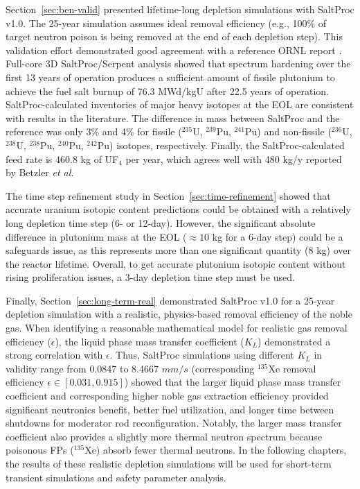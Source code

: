Section~\ref{sec:ben-valid} presented lifetime-long depletion simulations with 
SaltProc v1.0. The 25-year simulation assumes ideal removal efficiency 
(e.g., 100\% of target neutron poison is being removed at the end of each 
depletion 
step). This validation effort demonstrated good agreement with a reference 
ORNL report \cite{betzler_assessment_2017-1}. Full-core 3D SaltProc/Serpent 
analysis showed that spectrum 
hardening over the first 13 years of operation 
produces a sufficient amount of fissile plutonium to achieve the fuel salt 
burnup of 76.3 MWd/kgU after 22.5 years of operation. SaltProc-calculated 
inventories of major heavy isotopes at the \gls{EOL} are consistent with 
results in the literature. The difference in mass between SaltProc and the 
reference was only 3\% and 4\% for fissile ($^{235}$U, $^{239}$Pu, $^{241}$Pu) 
and non-fissile ($^{236}$U, $^{238}$U, $^{238}$Pu, $^{240}$Pu, $^{242}$Pu) 
isotopes, respectively. Finally, the SaltProc-calculated feed rate is 460.8 kg 
of UF$_4$ per year, which agrees well with 480 kg/y reported by Betzler 
\emph{et al.} \cite{betzler_assessment_2017-1}

The time step refinement study in Section~\ref{sec:time-refinement} showed 
that accurate uranium isotopic content predictions could be obtained with a 
relatively long depletion time step (6- or 12-day). However, the significant 
absolute difference in plutonium mass at the \gls{EOL} ($\approx10$ kg for a 
6-day step) could be a safeguards issue, as this represents more than one 
significant quantity (8 kg) over the reactor lifetime. Overall, to get 
accurate plutonium isotopic content without rising proliferation issues, a 
3-day depletion time step must be used.

Finally, Section~\ref{sec:long-term-real} demonstrated SaltProc v1.0 for a
25-year depletion simulation with a realistic, physics-based removal 
efficiency of the noble gas. When identifying a reasonable mathematical model 
for realistic gas removal efficiency ($\epsilon$), the liquid phase mass 
transfer coefficient ($K_L$) demonstrated a strong correlation with 
$\epsilon$. Thus, SaltProc simulations using different $K_L$ in validity range 
from 0.0847 to 8.4667 $mm/s$ (corresponding $^{135}$Xe removal efficiency 
$\epsilon\in [0.031,0.915]$) showed that the larger liquid phase mass transfer 
coefficient and corresponding higher noble gas extraction efficiency provided 
significant neutronics benefit, better fuel utilization, and longer time 
between shutdowns for moderator rod reconfiguration. Notably, the larger mass 
transfer coefficient also provides a slightly more thermal neutron spectrum 
because poisonous \glspl{FP} ($^{135}$Xe) absorb fewer thermal neutrons. In 
the following chapters, the results of these realistic depletion simulations 
will be used for short-term transient simulations and safety parameter 
analysis. 
